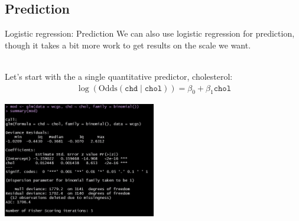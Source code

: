\documentclass[10pt,t]{beamer}
\begin{document}
\subsection{Prediction}
\begin{frame}{Logistic regression: Prediction}
	We can also use logistic regression for prediction, though it takes a bit more work to get results on the scale we want. 
	\\ ~\
	
	Let's start with the a single quantitative predictor, cholesterol:
	\begin{align*}
		\log(\text{Odds}(\texttt{chd} \mid \texttt{chol})) = \beta_0 + \beta_1 \texttt{chol}
	\end{align*}
	\begin{center}
	\includegraphics[width=0.5\textwidth]{./figs/simple_logistic_regression_chol}
\end{center}
\end{frame}
\end{document}
